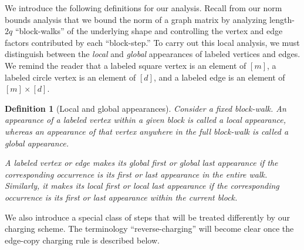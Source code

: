 \documentclass[12pt]{article}
\newtheorem{claim}[theorem]{Claim}
\newtheorem{definition}[theorem]{Definition}
\begin{document}

 

\propLocalTraversal*

We introduce the following definitions for our analysis. Recall from our norm bounds analysis that we bound the norm of a graph matrix by analyzing length-\(2q\) ``block-walks'' of the underlying shape and controlling the vertex and edge factors contributed by each ``block-step.'' To carry out this local analysis, we must distinguish between the \emph{local} and \emph{global} appearances of labeled vertices and edges. We remind the reader that a labeled square vertex is an element of \([m]\), a labeled circle vertex is an element of \([d]\), and a labeled edge is an element of \([m]\times[d]\).

\begin{definition}[Local and global appearances]
    Consider a fixed block-walk. An appearance of a labeled vertex within a given block is called a \emph{local appearance}, whereas an appearance of that vertex anywhere in the full block-walk is called a \emph{global appearance}.

    A labeled vertex or edge makes its \emph{global first} or \emph{global last appearance} if the corresponding occurrence is its first or last appearance in the entire walk. Similarly, it makes its \emph{local first} or \emph{local last appearance} if the corresponding occurrence is its first or last appearance within the current block.
\end{definition}

We also introduce a special class of steps that will be treated differently by our charging scheme. The terminology ``reverse-charging'' will become clear once the edge-copy charging rule is described below.
\end{document}
